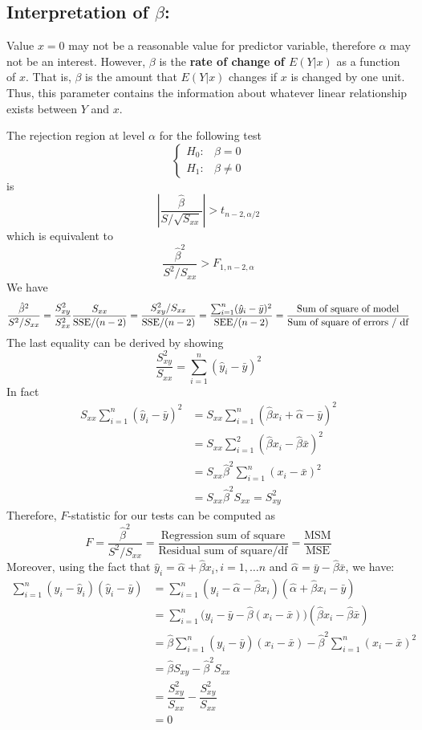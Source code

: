 \documentclass[11pt]{article}
\begin{document}
\subsection{Interpretation of $\beta$: }
Value $x= 0$ may not be a reasonable value for predictor variable, therefore $\alpha$ may not be an interest. However, $\beta$ is the \textbf{rate of change of $E(Y|x)$} as a function of $x$. That is, $\beta$ is the amount that $E(Y|x)$ changes if $x$ is changed by one unit. Thus, this parameter contains the information about whatever linear relationship exists between $Y$ and $x$. 

The rejection region at level $\alpha$ for the following test 
$$\begin{cases}
	H_0: & \beta = 0 \\ H_1: & \beta \neq 0 
\end{cases}$$
is 
\begin{equation} \label{eq: beta-t}
	\left|\dfrac{\hat{\beta }}{S / \sqrt{S_{xx}}}\right| > t_{n - 2, \alpha/2}
\end{equation}
which is equivalent  to 
$$ \dfrac{\hat{\beta }^2}{S^2 / S_{xx}} > F_{1, n - 2, \alpha} $$
We have
$$\dfrac{\hat{\beta }^2}{S^2 / S_{xx}} = \dfrac{S_{xy}^2}{S_{xx}^2 } \dfrac{S_{xx}}{\text{SSE} / (n - 2)} =  \dfrac{S_{xy}^2 / S_{xx}}{\text{SSE} / (n - 2)} = \dfrac{\sum_{i = 1}^n (\hat{y}_i - \bar{y})^2}{\text{SEE}/(n - 2)} = \dfrac{\text{Sum of square of model}}{\text{Sum of square of errors / \text{df}}}$$
The last equality can be derived by showing 
$$\dfrac{S_{xy}^2}{S_{xx}} = \sum_{i = 1}^n (\hat{y}_i - \bar{y})^2$$
In fact 
\begin{align*}
	S_{xx} \sum_{i = 1}^n(\hat{y}_i - \bar{y})^2 & = S_{xx} \sum_{i = 1}^n (\hat{\beta} x_i + \hat{\alpha} - \bar{y})^2 \\
	& = S_{xx} \sum_{i = 1}^2 (\hat{\beta }x_i - \hat{\beta } \bar{x})^2 \\
	& = S_{xx} \hat{\beta}^2 \sum_{i = 1}^n (x_i - \bar{x})^2 \\
	& = S_{xx} \hat{\beta}^2S_{xx} = S_{xy}^2
\end{align*}
Therefore, $F$-statistic for our tests can be computed as 
$$F = \dfrac{\hat{\beta}^2}{S^2 / S_{xx}} = \dfrac{\text{Regression sum of square}}{\text{Residual sum of square} / \text{df}} = \dfrac{\text{MSM}}{\text{MSE}}$$
Moreover, using the fact that $\hat{y}_i = \hat{\alpha} + \hat{\beta } x_i, i = 1 , \dots n$ and $ \hat{\alpha} = \bar{y} - \hat{\beta } \bar{x}$, we have: 
\begin{align*}
	\sum_{i = 1}^n (y_i  - \hat{y}_i)(\hat{y}_i  - \bar{y}) & =  \sum_{i = 1}^n (y_i - \hat{\alpha} - \hat{\beta} x_i)( \hat{\alpha} + \hat{\beta} x_i - \bar{y}) \\
	& = \sum_{i = 1}^n \big(y_i - \bar{y} - \hat{\beta }(x_i - \bar{x})\big)(\hat{\beta} x_i - \hat{\beta } \bar{x})\\ 
	& = \hat{\beta}\sum_{i = 1}^n (y_i - \bar{y})(x_i - \bar{x})  - \hat{\beta}^2 \sum_{i = 1}^n (x_i - \bar{x})^2 \\
	& = \hat{\beta} S_{xy} - \hat{\beta}^2 S_{xx} \\
	& = \dfrac{S_{xy}^2}{S_{xx}} - \dfrac{S_{xy}^2}{S_{xx} } \\ 
	&= 0
\end{align*}
\end{document}
